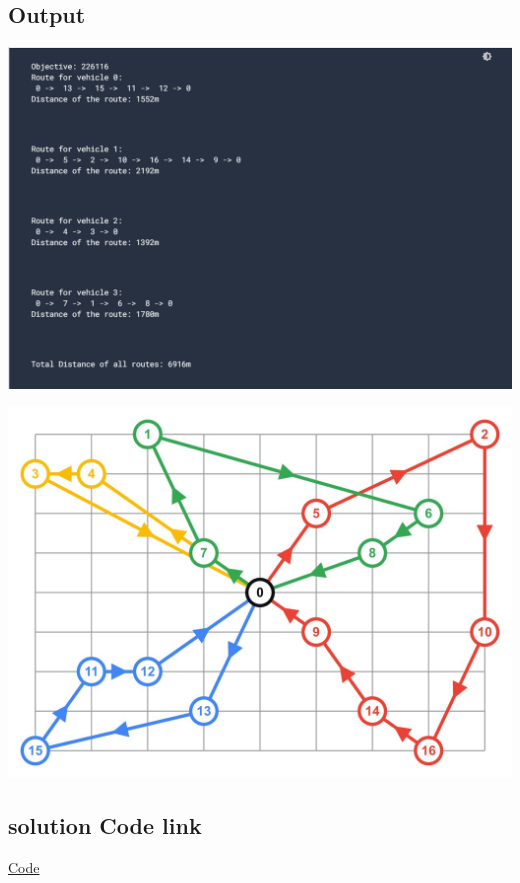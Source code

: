 \documentclass[conference]{IEEEtran}
\begin{document}
\begin{center}
\subsection{\textbf{Output}}    
\begin{center}
\includegraphics[width=1\linewidth]{
result.png}\par  
\end{center}

\begin{center}
\includegraphics[width=1\linewidth]{
output.jpg}\par  
\end{center}


\subsection{\textbf{solution Code link}}    

\href{https://bit.ly/3r7MkHB}{Code}
\end{center}
\end{document}
